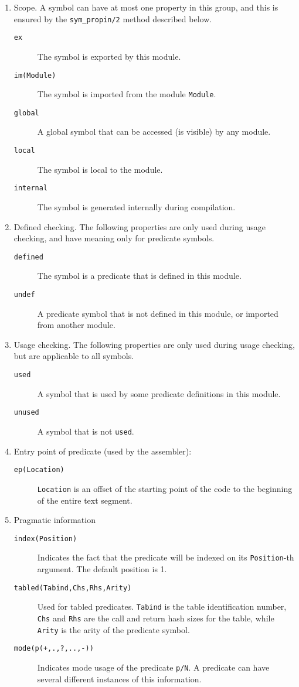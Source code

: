 \begin{enumerate}
\item	Scope.  A symbol can have at most one property in this group,
	and this is ensured by the {\tt sym\_propin/2} method described below.
	\begin{description}
	\item[{\tt ex}]		The symbol is exported by this module.
	\item[{\tt im(Module)}]	The symbol is imported from the module
				{\tt Module}.
	\item[{\tt global}]	A global symbol that can be accessed
				(is visible) by any module.
	\item[{\tt local}]	The symbol is local to the module.
	\item[{\tt internal}]	The symbol is generated internally
				during compilation.
	\end{description}
\item	Defined checking.  The following properties are only used during usage 
	checking, and have meaning only for predicate symbols.
	\begin{description}
	\item[{\tt defined}]	The symbol is a predicate that is defined in
				this module.
	\item[{\tt undef}]	A predicate symbol that is not defined in
				this module, or imported from another module.
	\end{description}
\item	Usage checking.  The following properties are only used during usage 
	checking, but are applicable to all symbols.
	\begin{description}
	\item[{\tt used}]	A symbol that is used by some predicate
				definitions in this module.
	\item[{\tt unused}]	A symbol that is not {\tt used}.
	\end{description}
\item	Entry point of predicate (used by the assembler):
	\begin{description}
	\item[{\tt ep(Location)}]
		{\tt Location} is an offset of the starting point of the
		code to the beginning of the entire text segment.
	\end{description}
\item	Pragmatic information
	\begin{description}
	\item[{\tt index(Position)}]
		Indicates the fact that the predicate will be indexed on
		its {\tt Position}-th argument.  The default position is 1.
	\item[{\tt tabled(Tabind,Chs,Rhs,Arity)}]
		Used for tabled predicates.  {\tt Tabind} is the table
		identification number, {\tt Chs} and {\tt Rhs} are the call
		and return hash sizes for the table, while {\tt Arity} is
		the arity of the predicate symbol.
	\item[{\tt mode(p(+,.,?,..,-))}]
		Indicates mode usage of the predicate {\tt p/N}.  A predicate
		can have several different instances of this information.
	\end{description}
\end{enumerate}


